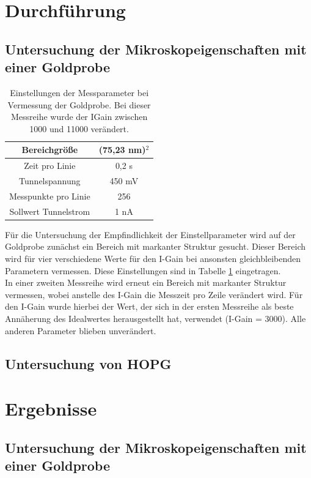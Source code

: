 \documentclass[12pt,a4paper]{article}
\begin{document}
\section{Durchführung}
\subsection{Untersuchung der Mikroskopeigenschaften mit einer Goldprobe}

\begin{table}
\centering
\begin{tabular}{|c|c|}
\hline 
Bereichgröße & (75,23 nm)$^2$ \\ 
\hline 
Zeit pro Linie & 0,2 s \\
\hline 
Tunnelspannung & 450 mV \\ 
\hline 
Messpunkte pro Linie & 256 \\
\hline 
Sollwert Tunnelstrom & 1 nA \\
\hline 
\end{tabular} 
\caption{Einstellungen der Messparameter bei Vermessung der Goldprobe. Bei dieser Messreihe wurde der IGain zwischen 1000 und 11000 verändert.}
\label{tab:IGain_Einstellungen}
\end{table}

Für die Untersuchung der Empfindlichkeit der Einstellparameter wird auf der Goldprobe zunächst ein Bereich mit markanter Struktur gesucht. Dieser Bereich wird für vier verschiedene Werte für den I-Gain bei ansonsten gleichbleibenden Parametern vermessen. Diese Einstellungen sind in Tabelle \ref{tab:IGain_Einstellungen} eingetragen.\\
In einer zweiten Messreihe wird erneut ein Bereich mit markanter Struktur vermessen, wobei anstelle des I-Gain die Messzeit pro Zeile verändert wird. Für den I-Gain wurde hierbei der Wert, der sich in der ersten Messreihe als beste Annäherung des Idealwertes herausgestellt hat, verwendet (I-Gain = 3000). Alle anderen Parameter blieben unverändert.

\subsection{Untersuchung von HOPG}

\section{Ergebnisse}
\subsection{Untersuchung der Mikroskopeigenschaften mit einer Goldprobe}
\end{document}
